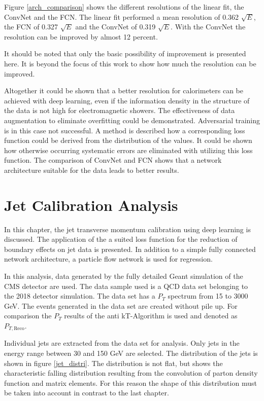 \documentclass[12pt, a4paper]{thesis}
\begin{document}
Figure \ref{arch_comparison} shows the different resolutions of the
linear fit, the ConvNet and the FCN. The linear fit performed a mean
resolution of 0.362 $\sqrt{E}$, the FCN of 0.327 $\sqrt{E}$ and the
ConvNet of 0.319 $\sqrt{E}$. With the ConvNet the resolution can be
improved by almost 12 percent.

It should be noted that only the basic possibility of improvement is
presented here. It is beyond the focus of this work to show how much
the resolution can be improved.

Altogether it could be shown that a better resolution for calorimeters
can be achieved with deep learning, even if the information density in
the structure of the data is not high for electromagnetic
showers. The effectiveness of data augmentation to eliminate
overfitting could be demonstrated. Adversarial training is in this
case not successful. A method is described how a corresponding loss
function could be derived from the distribution of the values. It
could be shown how otherwise occurring systematic errors are
eliminated with utilizing this loss function. The comparison of
ConvNet and FCN shows that a network architecture suitable for the
data leads to better results.

\chapter{Jet Calibration Analysis}
\label{sec:org03a9b39}

In this chapter, the jet transverse momentum calibration using deep
learning is discussed. {The application of the a suited loss function
  for the reduction of boundary effects on jet data is presented.} In
addition to a simple fully connected network architecture, a particle
flow network is used for regression.

In this analysis, data generated by the fully detailed Geant
simulation of the CMS detector are used. The data sample used is a QCD
data set belonging to the 2018 detector simulation. The data set has a
\(P_T\) spectrum from 15 to 3000 GeV. The events generated in the data
set are created without pile up. For comparison the $P_T$ results of
the anti kT-Algorithm is used and denoted as $P_{T, \text{Reco}}$.

Individual jets are extracted from the data set for analysis. Only
jets in the energy range between 30 and 150 GeV are selected. The
distribution of the jets is shown in figure \ref{jet_distri}. The
distribution is not flat, but shows the characteristic falling
distribution resulting from the convolution of parton density function
and matrix elements. For this reason the shape of this distribution
must be taken into account in contrast to the last chapter.
\end{document}
